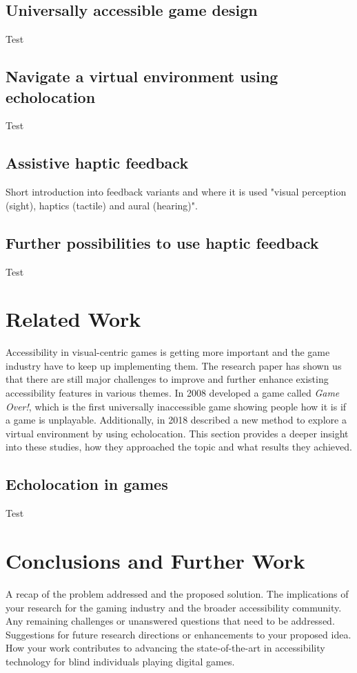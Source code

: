 \documentclass[sigconf,natbib=false,10pt]{acmart}
\begin{document}
	\subsection{Universally accessible game design}
	Test
	
	
	\subsection{Navigate a virtual environment using echolocation}
	Test
	
	\subsection{Assistive haptic feedback}
	Short introduction into feedback variants and where it is used "visual perception (sight), haptics (tactile) and aural (hearing)". \cite{kuber_towards_2007}
	
	\subsection{Further possibilities to use haptic feedback}
	Test
	
	\section{Related Work}
	Accessibility in visual-centric games is getting more important and the game industry have to keep up implementing them.
	The research paper \textcite{goncalves_my_2023} has shown us that there are still major challenges to improve and further enhance existing accessibility features in various themes.
	In 2008 \textcite{grammenos_game_2008} developed a game called \emph{Game Over!}, which is the first universally inaccessible game showing people how it is if a game is unplayable.
	Additionally, in 2018 \textcite{andrade_echo-house_2018} described a new method to explore a virtual environment by using echolocation.
	This section provides a deeper insight into these studies, how they approached the topic and what results they achieved.
	
	\subsection{Echolocation in games}
	Test
	
	\section{Conclusions and Further Work}
	A recap of the problem addressed and the proposed solution.
	The implications of your research for the gaming industry and the broader accessibility community.
	Any remaining challenges or unanswered questions that need to be addressed.
	Suggestions for future research directions or enhancements to your proposed idea.
	How your work contributes to advancing the state-of-the-art in accessibility technology for blind individuals playing digital games.
	
	
	\printbibliography
	
\end{document}
